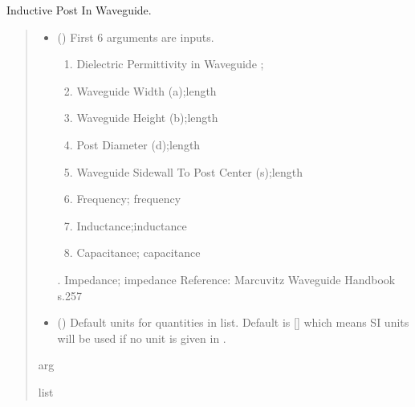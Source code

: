 \documentclass[letterpaper,10pt,english]{sphinxmanual}
\begin{document}
\begin{fulllineitems}
\label{\detokenize{components:components.InductivePostInWaveguide}}
\pysigstartsignatures
{}
\pysigstopsignatures
\sphinxAtStartPar
Inductive Post In Waveguide.
\begin{quote}\begin{description}
\begin{itemize}
\item {}
\sphinxAtStartPar
{} () \textendash{}
\sphinxAtStartPar
First 6 arguments are inputs.
\begin{enumerate}
%
\item {}
\sphinxAtStartPar
Dielectric Permittivity in Waveguide ;

\item {}
\sphinxAtStartPar
Waveguide Width (a);length

\item {}
\sphinxAtStartPar
Waveguide Height (b);length

\item {}
\sphinxAtStartPar
Post Diameter (d);length

\item {}
\sphinxAtStartPar
Waveguide Sidewall To Post Center (s);length

\item {}
\sphinxAtStartPar
Frequency; frequency

\item {}
\sphinxAtStartPar
Inductance;inductance

\item {}
\sphinxAtStartPar
Capacitance; capacitance

\end{enumerate}

. Impedance; impedance
Reference:  Marcuvitz Waveguide Handbook s.257


\item {}
\sphinxAtStartPar
{} (\sphinxstyleliteralemphasis{\sphinxupquote{, }}) \textendash{} Default units for quantities in  list. Default is {[}{]} which means SI units will be used if no unit is given in .

\end{itemize}

\sphinxAtStartPar
arg

\sphinxAtStartPar
list

\end{description}\end{quote}

\end{fulllineitems}
\end{document}
